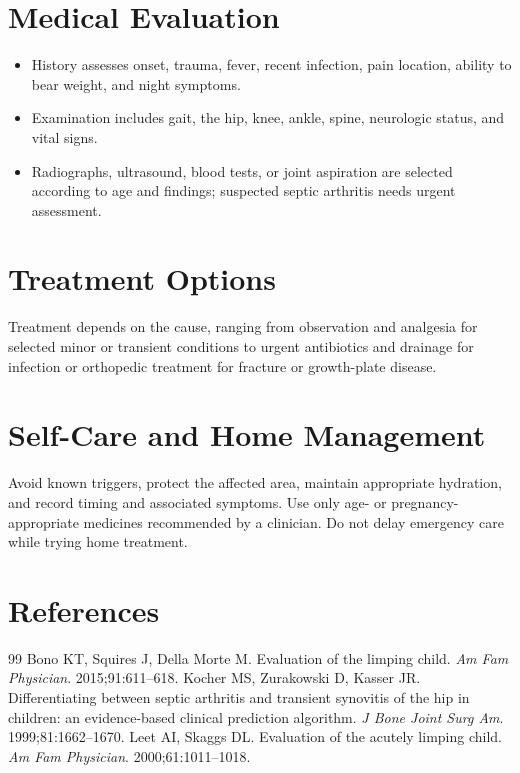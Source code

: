 \section*{Medical Evaluation}
\begin{itemize}
  \item History assesses onset, trauma, fever, recent infection, pain location, ability to bear weight, and night symptoms.
  \item Examination includes gait, the hip, knee, ankle, spine, neurologic status, and vital signs.
  \item Radiographs, ultrasound, blood tests, or joint aspiration are selected according to age and findings; suspected septic arthritis needs urgent assessment.
\end{itemize}

\section*{Treatment Options}
Treatment depends on the cause, ranging from observation and analgesia for selected minor or transient conditions to urgent antibiotics and drainage for infection or orthopedic treatment for fracture or growth-plate disease.

\section*{Self-Care and Home Management}
Avoid known triggers, protect the affected area, maintain appropriate hydration, and record timing and associated symptoms. Use only age- or pregnancy-appropriate medicines recommended by a clinician. Do not delay emergency care while trying home treatment.

\section*{References}
\begin{thebibliography}{99}
 Bono KT, Squires J, Della Morte M. Evaluation of the limping child. \textit{Am Fam Physician}. 2015;91:611--618.
 Kocher MS, Zurakowski D, Kasser JR. Differentiating between septic arthritis and transient synovitis of the hip in children: an evidence-based clinical prediction algorithm. \textit{J Bone Joint Surg Am}. 1999;81:1662--1670.
 Leet AI, Skaggs DL. Evaluation of the acutely limping child. \textit{Am Fam Physician}. 2000;61:1011--1018.
\end{thebibliography}
